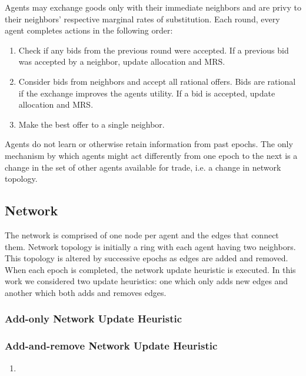 \documentclass[smallextended]{svjour3}
\begin{document}
Agents may exchange goods only with their immediate neighbors and are privy to their
neighbors' respective marginal rates of substitution. Each round, every agent
completes actions in the following order:
\begin{enumerate}
\item Check if any bids from the previous round were accepted.
If a previous bid was accepted by a neighbor, update allocation and MRS.
\item Consider bids from neighbors and accept all rational offers.
Bids are rational if the exchange improves the agents utility. If a bid is
accepted, update allocation and MRS.
\item Make the best offer to a single neighbor.
\end{enumerate}

Agents do not learn or otherwise retain information from past epochs.
The only mechanism by which agents might act differently from one epoch to the next is
a change in the set of other agents available for trade, i.e. a change in
network topology.

\subsection{Network}
The network is comprised of one node per agent and the edges that connect them.
Network topology is initially a ring with each agent having two neighbors.
This topology is altered by successive epochs as edges are added and removed.
When each epoch is completed, the network update heuristic is executed. In this work
we considered two update heuristics: one which only adds new edges and another
which both adds and removes edges.
\subsubsection{Add-only Network Update Heuristic}
\subsubsection{Add-and-remove Network Update Heuristic}
\begin{enumerate}
\item
\end{enumerate}
\end{document}
